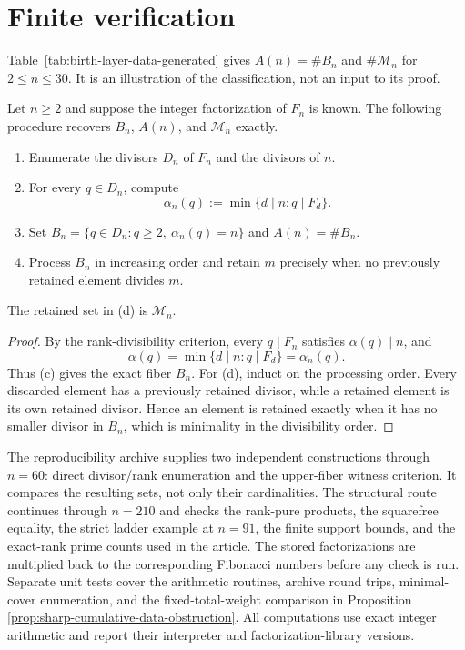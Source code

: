 \section{Finite verification}\label{sec:numerical}

Table~\ref{tab:birth-layer-data-generated} gives
$A(n)=\#B_n$ and $\#\mathcal M_n$ for $2\leq n\leq30$.  It is an
illustration of the classification, not an input to its proof.

\begin{proposition}
\label{prop:effective-birth-layer-computation}
Let $n\geq2$ and suppose the integer factorization of $F_n$ is known.  The
following procedure recovers $B_n$, $A(n)$, and $\mathcal M_n$ exactly.
\begin{enumerate}[label=(\alph*)]
\item Enumerate the divisors $D_n$ of $F_n$ and the divisors of $n$.
\item For every $q\in D_n$, compute
\[
 \alpha_n(q):=\min\{d\mid n:q\mid F_d\}.
\]
\item Set $B_n=\{q\in D_n:q\geq2,\ \alpha_n(q)=n\}$ and
$A(n)=\#B_n$.
\item Process $B_n$ in increasing order and retain $m$ precisely when no
previously retained element divides $m$.
\end{enumerate}
The retained set in (d) is $\mathcal M_n$.
\end{proposition}

\begin{proof}
By the rank-divisibility criterion, every $q\mid F_n$ satisfies
$\alpha(q)\mid n$, and
\[
 \alpha(q)=\min\{d\mid n:q\mid F_d\}=\alpha_n(q).
\]
Thus (c) gives the exact fiber $B_n$.  For (d), induct on the processing
order.  Every discarded element has a previously retained divisor, while a
retained element is its own retained divisor.  Hence an element is retained
exactly when it has no smaller divisor in $B_n$, which is minimality in the
divisibility order.
\end{proof}



The reproducibility archive supplies two independent constructions through
$n=60$: direct divisor/rank enumeration and the upper-fiber witness
criterion.  It compares the resulting sets, not only their cardinalities.
The structural route continues through $n=210$ and checks the rank-pure
products, the squarefree equality, the strict ladder example at $n=91$, the
finite support bounds, and the exact-rank prime counts used in the article.
The stored factorizations are multiplied back to the corresponding Fibonacci
numbers before any check is run.  Separate unit tests cover the arithmetic
routines, archive round trips, minimal-cover enumeration, and the
fixed-total-weight comparison in Proposition~
\ref{prop:sharp-cumulative-data-obstruction}.  All computations use exact
integer arithmetic and report their interpreter and factorization-library
versions.
